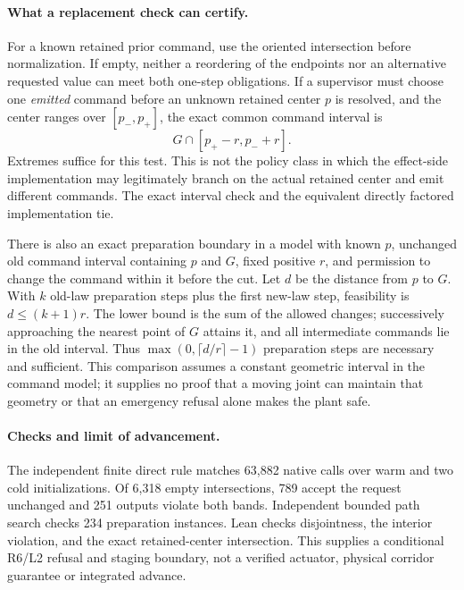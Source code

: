 \documentclass{article}
\begin{document}
\paragraph{What a replacement check can certify.}
For a known retained prior command, use the oriented intersection
before normalization. If empty, neither a reordering of the endpoints
nor an alternative requested value can meet both one-step obligations.
If a supervisor must choose one \emph{emitted} command before an unknown
retained center $p$ is resolved, and the center ranges over
$[p_-,p_+]$, the exact common command interval is
\[
  G \cap [p_+-r,p_-+r].
\]
Extremes suffice for this test. This is not the policy class in which
the effect-side implementation may legitimately branch on the actual
retained center and emit different commands. The exact interval check
and the equivalent directly factored implementation tie.

There is also an exact preparation boundary in a model with known
$p$, unchanged old command interval containing $p$ and $G$, fixed
positive $r$, and permission to change the command within it before
the cut. Let $d$ be the distance from $p$ to $G$. With $k$ old-law
preparation steps plus the first new-law step, feasibility is
$d\le(k+1)r$. The lower bound is the sum of the allowed changes;
successively approaching the nearest point of $G$ attains it, and
all intermediate commands lie in the old interval. Thus
$\max(0,\lceil d/r\rceil-1)$ preparation steps are necessary and
sufficient. This comparison assumes a constant geometric interval
in the command model; it supplies no proof that a moving joint
can maintain that geometry or that an emergency refusal alone
makes the plant safe.

\paragraph{Checks and limit of advancement.}
The independent finite direct rule matches 63,882 native calls over
warm and two cold initializations. Of 6,318 empty intersections,
789 accept the request unchanged and 251 outputs violate both
bands. Independent bounded path search checks 234 preparation
instances. Lean checks disjointness, the interior violation,
and the exact retained-center intersection. This supplies a
conditional R6/L2 refusal and staging boundary, not a verified
actuator, physical corridor guarantee or integrated advance.
\end{document}
